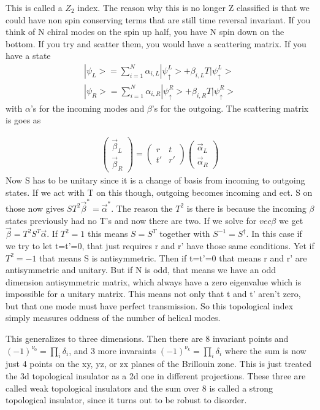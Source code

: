 This is called a $Z_2$ index. The reason why this is no longer Z classified is that we could have non spin conserving terms that are still time reversal invariant. If you think of N chiral modes on the spin up half, you have N spin down on the bottom. If you try and scatter them, you would have a scattering matrix. If  you have a state
\begin{align}
|\psi_{L}>=\sum_{i=1}^N \alpha_{i,L}|\psi_\uparrow^L>+\beta_{i,L} T|\psi_\uparrow^L> \\
|\psi_{R}>=\sum_{i=1}^N \alpha_{i,R}|\psi_\uparrow^R>+\beta_{i,R} T|\psi_\uparrow^R>  
\end{align}
with $\alpha$'s for the incoming modes and $\beta$'s for the outgoing. The scattering matrix is goes as 

\begin{align}
\begin{pmatrix}
\vec{\beta}_L \\
\vec{\beta}_R
\end{pmatrix}
=
\begin{pmatrix}
r & t\\
t' & r'
\end{pmatrix}
\begin{pmatrix}
\vec{\alpha}_L \\
\vec{\alpha}_R
\end{pmatrix}
\end{align}
Now S has to be unitary since it is a change of basis from incoming to outgoing states. If we act with T on this though, outgoing becomes incoming and ect. S on those now gives $ST^2\vec{\beta}^*=\vec{\alpha}^*$. The reason the $T^2$ is there is because the incoming $\beta$ states previously had no T's and now there are two. If we solve for $vec{\beta}$ we get $\vec{\beta}=T^2S^T\vec{\alpha}$. If $T^2=1$ this means $S=S^T$ together with $S^{-1}=S^\dag$. In this case if we try to let t=t'=0, that just requires r and r' have those same conditions. Yet if $T^2=-1$ that means S is antisymmetric. Then if t=t'=0 that means r and r' are antisymmetric and unitary. But if N is odd, that means we have an odd dimension antisymmetric matrix, which always have a zero eigenvalue which is impossible for a unitary matrix. This means not only that t and t' aren't zero, but that one mode must have perfect transmission. So this topological index simply measures oddness of the number of helical modes.

This generalizes to three dimensions. Then there are 8 invariant points and $(-1)^{\nu_0} = \prod_i \delta_i$, and 3 more invaraints $(-1)^{\nu_k} = \prod_i \delta_i$ where the sum is now just 4 points on the xy, yz, or zx planes of the Brillouin zone. This is just treated the 3d topological insulator as a 2d one in different projections. These three are called weak topological insulators and the sum over 8 is called a strong topological insulator, since it turns out to be robust to disorder.

